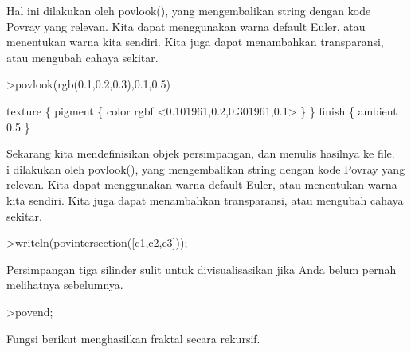 \documentclass[a4paper,10pt]{article}
\begin{document}
\begin{eulernotebook}
\begin{eulercomment}
Hal ini dilakukan oleh povlook(), yang mengembalikan string dengan
kode Povray yang relevan. Kita dapat menggunakan warna default Euler,
atau menentukan warna kita sendiri. Kita juga dapat menambahkan
transparansi, atau mengubah cahaya sekitar.
\end{eulercomment}
\begin{eulerprompt}
>povlook(rgb(0.1,0.2,0.3),0.1,0.5)
\end{eulerprompt}
\begin{euleroutput}
   texture \{ pigment \{ color rgbf <0.101961,0.2,0.301961,0.1> \}  \} 
   finish \{ ambient 0.5 \} 
  
\end{euleroutput}
\begin{eulercomment}
Sekarang kita mendefinisikan objek persimpangan, dan menulis hasilnya
ke file.\\
i dilakukan oleh povlook(), yang mengembalikan string dengan kode
Povray yang relevan. Kita dapat menggunakan warna default Euler, atau
menentukan warna kita sendiri. Kita juga dapat menambahkan
transparansi, atau mengubah cahaya sekitar.
\end{eulercomment}
\begin{eulerprompt}
>writeln(povintersection([c1,c2,c3]));
\end{eulerprompt}
\begin{eulercomment}
Persimpangan tiga silinder sulit untuk divisualisasikan jika Anda
belum pernah melihatnya sebelumnya.
\end{eulercomment}
\begin{eulerprompt}
>povend;
\end{eulerprompt}
\begin{eulercomment}
Fungsi berikut menghasilkan fraktal secara rekursif.


\end{eulercomment}
\end{eulernotebook}
\end{document}
